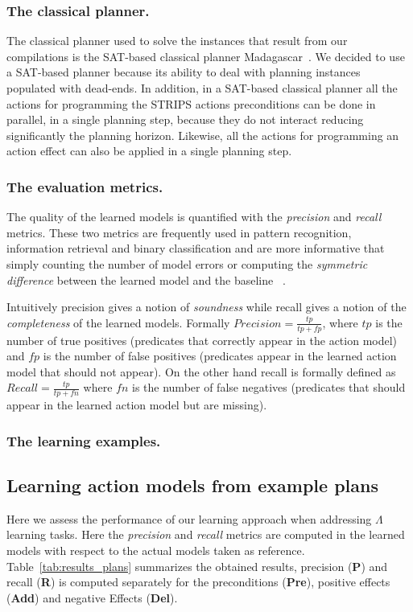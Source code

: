\documentclass[letterpaper]{article} %
\begin{document}
\subsubsection{The classical planner.}
The classical planner used to solve the instances that result from our compilations is the SAT-based classical planner {\sc Madagascar}~\cite{rintanen2014madagascar}. We decided to use a SAT-based planner because its ability to deal with planning instances populated with dead-ends. In addition, in a SAT-based classical planner all the actions for programming the STRIPS actions preconditions can be done in parallel, in a single planning step, because they do not interact reducing significantly the planning horizon. Likewise, all the actions for programming an action effect can also be applied in a single planning step.


\subsubsection{The evaluation metrics.}
The quality of the learned models is quantified with the {\em precision} and {\em recall} metrics. These two metrics are frequently used in pattern recognition, information retrieval and binary classification and are more informative that simply counting the number of model errors or computing the {\em symmetric difference} between the learned model and the baseline ~\cite{davis2006relationship}.

Intuitively precision gives a notion of {\em soundness} while recall gives a notion of the {\em completeness} of the learned models. Formally $Precision=\frac{tp}{tp+fp}$, where $tp$ is the number of true positives (predicates that correctly appear in the action model) and $fp$ is the number of false positives (predicates appear in the learned action model that should not appear). On the other hand recall is formally defined as $Recall=\frac{tp}{tp+fn}$ where $fn$ is the number of false negatives (predicates that should appear in the learned action model but are missing).


\subsubsection{The learning examples.}


\subsection{Learning action models from example plans}
Here we assess the performance of our learning approach when addressing $\Lambda$ learning tasks. Here the {\em precision} and {\em recall} metrics are computed in the learned models with respect to the actual models taken as reference. Table~\ref{tab:results_plans} summarizes the obtained results, precision ({\bf P}) and recall ({\bf R}) is computed separately for the preconditions ({\bf Pre}), positive effects ({\bf Add}) and negative Effects ({\bf Del}).
\end{document}
